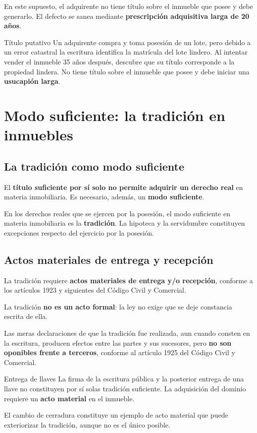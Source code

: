 \documentclass[12pt,oneside]{book}
\begin{document}
En este supuesto, el adquirente no tiene título sobre el inmueble que posee y debe generarlo. El defecto se sanea mediante \textbf{prescripción adquisitiva larga de 20 años}.

\begin{example}{Título putativo}
Un adquirente compra y toma posesión de un lote, pero debido a un error catastral la escritura identifica la matrícula del lote lindero. Al intentar vender el inmueble 35 años después, descubre que su título corresponde a la propiedad lindera. No tiene título sobre el inmueble que posee y debe iniciar una \textbf{usucapión larga}.
\end{example}

\chapter{Modo suficiente: la tradición en inmuebles}

\section{La tradición como modo suficiente}

El \textbf{título suficiente por sí solo no permite adquirir un derecho real} en materia inmobiliaria. Es necesario, además, un \textbf{modo suficiente}.

En los derechos reales que se ejercen por la posesión, el modo suficiente en materia inmobiliaria es la \textbf{tradición}. La hipoteca y la servidumbre constituyen excepciones respecto del ejercicio por la posesión.

\section{Actos materiales de entrega y recepción}

La tradición requiere \textbf{actos materiales de entrega y/o recepción}, conforme a los artículos 1923 y siguientes del Código Civil y Comercial.

La tradición \textbf{no es un acto formal}: la ley no exige que se deje constancia escrita de ella.

Las meras declaraciones de que la tradición fue realizada, aun cuando consten en la escritura, producen efectos entre las partes y sus sucesores, pero \textbf{no son oponibles frente a terceros}, conforme al artículo 1925 del Código Civil y Comercial.

\begin{example}{Entrega de llaves}
La firma de la escritura pública y la posterior entrega de una llave no constituyen por sí solas tradición suficiente. La adquisición del dominio requiere un \textbf{acto material} en el inmueble.

El cambio de cerradura constituye un ejemplo de acto material que puede exteriorizar la tradición, aunque no es el único posible.
\end{example}
\end{document}
